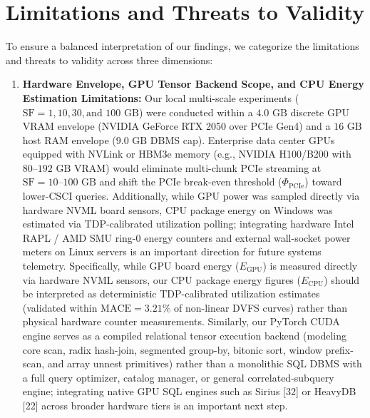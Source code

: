 \documentclass[10pt,a4paper]{article}
\begin{document}
\section{Limitations and Threats to Validity}
To ensure a balanced interpretation of our findings, we categorize the limitations and threats to validity across three dimensions:
\begin{enumerate}[leftmargin=1.5em,itemsep=2pt]
    \item \textbf{Hardware Envelope, GPU Tensor Backend Scope, and CPU Energy Estimation Limitations:} Our local multi-scale experiments ($\text{SF}=1, 10, 30, \text{and } 100\text{ GB}$) were conducted within a $4.0\text{ GB}$ discrete GPU VRAM envelope (NVIDIA GeForce RTX 2050 over PCIe Gen4) and a $16\text{ GB}$ host RAM envelope ($9.0\text{ GB}$ DBMS cap). Enterprise data center GPUs equipped with NVLink or HBM3e memory (e.g., NVIDIA H100/B200 with $80\text{--}192\text{ GB}$ VRAM) would eliminate multi-chunk PCIe streaming at $\text{SF}=10\text{--}100\text{ GB}$ and shift the PCIe break-even threshold ($\Phi_{\text{PCIe}}$) toward lower-CSCI queries. Additionally, while GPU power was sampled directly via hardware NVML board sensors, CPU package energy on Windows was estimated via TDP-calibrated utilization polling; integrating hardware Intel RAPL / AMD SMU ring-0 energy counters and external wall-socket power meters on Linux servers is an important direction for future systems telemetry. Specifically, while GPU board energy ($E_{\text{GPU}}$) is measured directly via hardware NVML sensors, our CPU package energy figures ($E_{\text{CPU}}$) should be interpreted as deterministic TDP-calibrated utilization estimates (validated within $\text{MACE}=3.21\%$ of non-linear DVFS curves) rather than physical hardware counter measurements. Similarly, our PyTorch CUDA engine serves as a compiled relational tensor execution backend (modeling core scan, radix hash-join, segmented group-by, bitonic sort, window prefix-scan, and array unnest primitives) rather than a monolithic SQL DBMS with a full query optimizer, catalog manager, or general correlated-subquery engine; integrating native GPU SQL engines such as Sirius [32] or HeavyDB [22] across broader hardware tiers is an important next step.

\end{enumerate}
\end{document}
